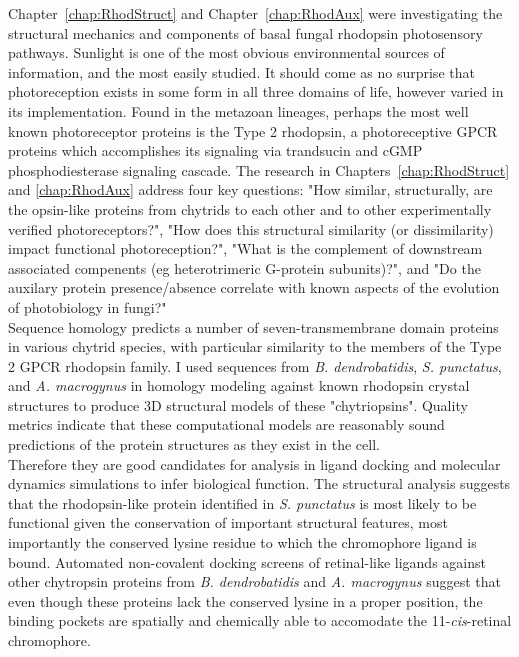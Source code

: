 \indent Chapter~\ref{chap:RhodStruct} and Chapter~\ref{chap:RhodAux} were investigating the structural mechanics and components of basal fungal rhodopsin photosensory pathways. Sunlight is one of the most obvious environmental sources of information, and the most easily studied. It should come as no surprise that photoreception exists in some form in all three domains of life, however varied in its implementation. Found in the metazoan lineages, perhaps the most well known photoreceptor proteins is the Type 2 rhodopsin, a photoreceptive GPCR proteins which accomplishes its signaling via trandsucin and cGMP phosphodiesterase signaling cascade. The research in Chapters~\ref{chap:RhodStruct} and \ref{chap:RhodAux} address four key questions: "How similar, structurally, are the opsin-like proteins from chytrids to each other and to other experimentally verified photoreceptors?", "How does this structural similarity (or dissimilarity) impact functional photoreception?", "What is the complement of downstream associated compenents (eg heterotrimeric G-protein subunits)?", and "Do the auxilary protein presence/absence correlate with known aspects of the evolution of photobiology in fungi?" \\
\indent Sequence homology predicts a number of seven-transmembrane domain proteins in various chytrid species, with particular similarity to the members of the Type 2 GPCR rhodopsin family. I used sequences from \textit{B. dendrobatidis}, \textit{S. punctatus}, and \textit{A. macrogynus} in homology modeling against known rhodopsin crystal structures to produce 3D structural models of these "chytriopsins". Quality metrics indicate that these computational models are reasonably sound predictions of the protein structures as they exist in the cell.\\
\indent Therefore they are good candidates for analysis in ligand docking and molecular dynamics simulations to infer biological function. The structural analysis suggests that the rhodopsin-like protein identified in \textit{S. punctatus} is most likely to be functional given the conservation of important structural features, most importantly the conserved lysine residue to which the chromophore ligand is bound. Automated non-covalent docking screens of retinal-like ligands against other chytropsin proteins from \textit{B. dendrobatidis} and \textit{A. macrogynus} suggest that even though these proteins lack the conserved lysine in a proper position, the binding pockets are spatially and chemically able to accomodate the 11-\textit{cis}-retinal chromophore.\\
